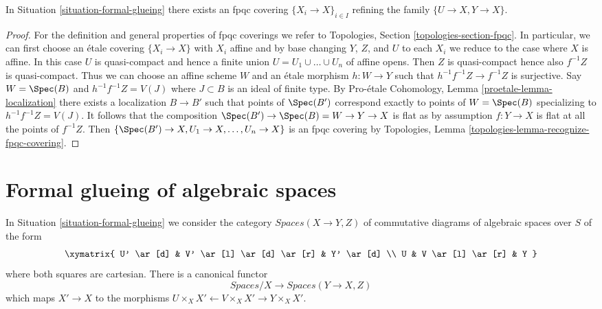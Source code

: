 \begin{lemma}
\label{lemma-dominate-by-fpqc-covering}
In Situation \ref{situation-formal-glueing} there exists an
fpqc covering $\{X_i \to X\}_{i \in I}$ refining the
family $\{U \to X, Y \to X\}$.
\end{lemma}

\begin{proof}
For the definition and general properties of fpqc coverings we refer to
Topologies, Section \ref{topologies-section-fpqc}. In particular, we can
first choose an \'etale covering $\{X_i \to X\}$ with $X_i$ affine and by
base changing $Y$, $Z$, and $U$ to each $X_i$ we reduce to the case where
$X$ is affine. In this case $U$ is quasi-compact and hence a finite union
$U = U_1 \cup \ldots \cup U_n$ of affine opens. 
Then $Z$ is quasi-compact hence also $f^{-1}Z$ is quasi-compact.
Thus we can choose an affine scheme $W$ and an \'etale morphism
$h : W \to Y$ such that $h^{-1}f^{-1}Z \to f^{-1}Z$ is surjective.
Say $W = \Spec(B)$ and $h^{-1}f^{-1}Z = V(J)$ where $J \subset B$
is an ideal of finite type.
By Pro-\'etale Cohomology, Lemma \ref{proetale-lemma-localization}
there exists a localization $B \to B'$ such that points of
$\Spec(B')$ correspond exactly to points of $W = \Spec(B)$
specializing to $h^{-1}f^{-1}Z = V(J)$. It follows that the
composition $\Spec(B') \to \Spec(B) = W \to Y \to X$ is flat
as by assumption $f : Y \to X$ is flat at all the points of $f^{-1}Z$. Then
$\{\Spec(B') \to X, U_1 \to X, \ldots, U_n \to X\}$
is an fpqc covering by
Topologies, Lemma \ref{topologies-lemma-recognize-fpqc-covering}.
\end{proof}




\section{Formal glueing of algebraic spaces}
\label{section-formal-glueing-spaces}

\noindent
In Situation \ref{situation-formal-glueing} we consider the category
$\textit{Spaces}(X \to Y, Z)$
of commutative diagrams of algebraic spaces over $S$ of the form
$$
\xymatrix{
U' \ar[d] & V' \ar[l] \ar[d] \ar[r] & Y' \ar[d] \\
U & V \ar[l] \ar[r] & Y
}
$$
where both squares are cartesian. There is a canonical functor
\begin{equation}
\label{equation-formal-glueing-spaces}
\textit{Spaces}/X \longrightarrow \textit{Spaces}(Y \to X, Z)
\end{equation}
which maps $X' \to X$ to the morphisms
$U \times_X X' \leftarrow V \times_X X' \rightarrow Y \times_X X'$.

